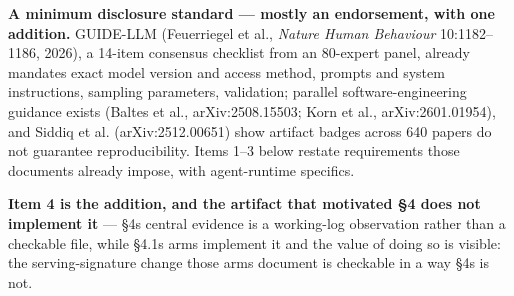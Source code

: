 \textbf{A minimum disclosure standard --- mostly an endorsement, with one addition.} GUIDE-LLM (Feuerriegel et al., \emph{Nature Human Behaviour} 10:1182--1186, 2026), a 14-item consensus checklist from an 80-expert panel, already mandates exact model version and access method, prompts and system instructions, sampling parameters, validation; parallel software-engineering guidance exists (Baltes et al., arXiv:2508.15503; Korn et al., arXiv:2601.01954), and Siddiq et al. (arXiv:2512.00651) show artifact badges across 640 papers do not guarantee reproducibility. Items 1--3 below restate requirements those documents already impose, with agent-runtime specifics.

\textbf{Item 4 is the addition, and the artifact that motivated §4 does not implement it} --- §4\textquotesingle s central evidence is a working-log observation rather than a checkable file, while §4.1\textquotesingle s arms implement it and the value of doing so is visible: the serving-signature change those arms document is checkable in a way §4\textquotesingle s is not.

